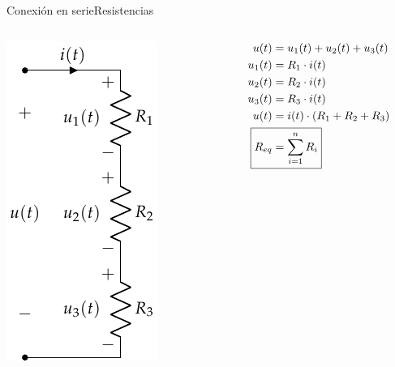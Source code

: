 \documentclass[aspectratio=169, xcolor={usenames,svgnames,dvipsnames}]{beamer}
\begin{document}
\begin{frame}{Conexión en serie}{Resistencias}
\begin{columns}
\begin{column}{0.3\columnwidth}
\begin{center}
\includegraphics[height=0.85\textheight]{../figs/AsociacionSerie.pdf}
\end{center}
\end{column}
\begin{column}{0.7\columnwidth}
\begin{align*}
  u(t) & = u_1(t) + u_2(t) + u_3(t)\\
  u_1(t) &= R_1 \cdot i(t)\\
  u_2(t) &= R_2 \cdot i(t)\\
  u_3(t) &= R_3 \cdot i(t)\\
  u(t)& = i(t) \cdot (R_1 + R_2 + R_3)\\
  \Aboxed{R_{eq} &= \sum_{i = 1}^n R_i}
\end{align*}
\end{column}
\end{columns}
\end{frame}
\end{document}
